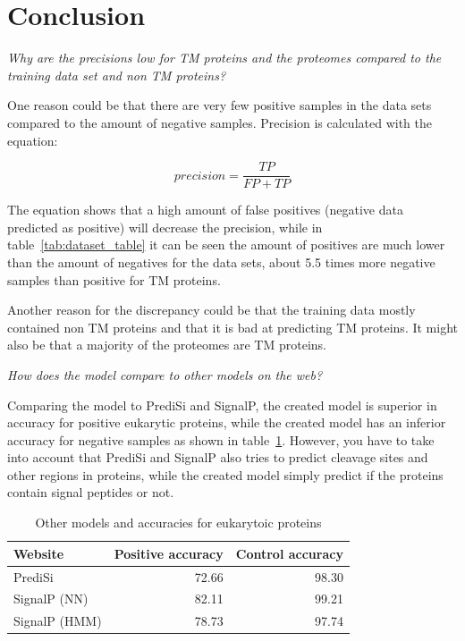 
\section{Conclusion}

{\em Why are the precisions low for TM proteins and the proteomes compared to the training data set and non TM proteins?}

One reason could be that there are very few positive samples in the data sets compared to the amount of negative samples. Precision is calculated with the equation:
\newline

\begin{equation}
	precision = \dfrac{TP}{FP+TP}
\end{equation}
\newline

The equation shows that a high amount of false positives (negative data predicted as positive) will decrease the precision, while in table~\ref{tab:dataset_table} it can be seen the amount of positives are much lower than the amount of negatives for the data sets, about 5.5 times more negative samples than positive for TM proteins.

Another reason for the discrepancy could be that the training data mostly contained non TM proteins and that it is bad at predicting TM proteins. It might also be that a majority of the proteomes are TM proteins.
\newline

{\em How does the model compare to other models on the web?}

Comparing the model to PrediSi and SignalP, the created model is superior in accuracy for positive eukarytic proteins, while the created model has an inferior accuracy for negative samples as shown in table~\ref{tab:other_models_table}. However, you have to take into account that PrediSi and  SignalP also tries to predict cleavage sites and other regions in proteins, while the created model simply predict if the proteins contain signal peptides or not.

\begin{table}[H]
\centering
\begin{tabular}{l | r | r}
Website & Positive accuracy & Control accuracy\\\hline
PrediSi & 72.66 & 98.30\\
SignalP (NN) & 82.11 & 99.21\\
SignalP (HMM) & 78.73 & 97.74\\
\end{tabular}
\caption{\label{tab:other_models_table}Other models and accuracies for eukarytoic proteins \cite{other_websites}}
\end{table}


